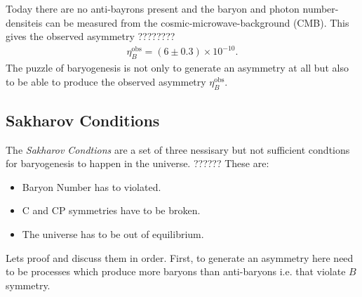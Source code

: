 \documentclass[13pt,a4paper,twoside,titlepage]{article}
\begin{document}
Today there are no anti-bayrons present and the baryon and photon number-densiteis can be
measured from the cosmic-microwave-background (CMB).
This gives the observed asymmetry ????????
\begin{align}
    \eta^\mathrm{obs}_B = (6 \pm 0.3) \times 10^{-10}.
\end{align}
The puzzle of baryogenesis is not only to generate an asymmetry at all but also to be able to produce the observed asymmetry $\eta^\mathrm{obs}_B$.

\subsection{Sakharov Conditions}
The \emph{Sakharov Condtions} are a set of three nessisary but not sufficient condtions for baryogenesis to happen in the universe. ?????? These are:
\begin{itemize}
    \item Baryon Number has to violated.
    \item C and CP symmetries have to be broken.
    \item The universe has to be out of equilibrium.
\end{itemize}
Lets proof and discuss them in order.
First, to generate an asymmetry here need to be processes which produce more baryons than anti-baryons i.e. that violate $B$ symmetry.
\end{document}
